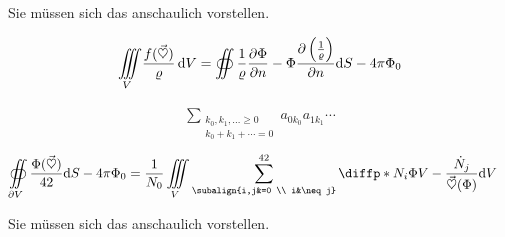 \documentclass[a4paper]{article}
\begin{document}
\begin{center}
	\sc Sie müssen sich das anschaulich vorstellen.
\end{center}
\begin{align*}
	\iiint\limits_V \! \frac{f(\vec{\heartsuit})}{\varrho} \, \textrm{d}V = \oiint \frac{1}{\varrho}\frac{\partial \Phi}{\partial n} - \Phi \frac{\partial \left(\frac{1}{\varrho}\right)}{\partial n} \textrm{d}S - 4\pi \Phi_0
\end{align*}
\begin{center}
\end{center}
\begin{align*}
	\sum_{\substack{k_0,k_1,\ldots\ge0\\k_0+k_1+\cdots=0}}a_{0k_0} a_{1k_1}\cdots
\end{align*}
\begin{align*}
	\oiint\limits_{\del V} \frac{\Phi(\vec{\heartsuit})}{42} \tdiff{S} - 4\pi\Phi_0 &= \frac{1}{N_0} \iiint\limits_V \sum_{\subalign{i,j&=0 \\ i&\neq j}}^{42} \pdiff*{N_i}{\Phi}{V}-\frac{\dot{N}_j}{\vec{\heartsuit}(\Phi)}\tdiff{V}
\end{align*}
\begin{center}
	\sc Sie müssen sich das anschaulich vorstellen.
\end{center}
\end{document}

